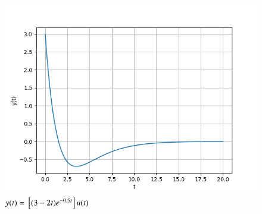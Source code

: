 \documentclass[journal,12pt,twocolumn]{IEEEtran}
\theoremstyle{remark}
\begin{document}
\begin{figure}[t]
    \centering
    \includegraphics[width=\columnwidth]{figs/fig1.png}
    \caption{$y(t) = {}\left[(3-2t)e^{-0.5t}\right]u(t)$}
    \label{fig:gate21ag26}
\end{figure}
\end{document}
